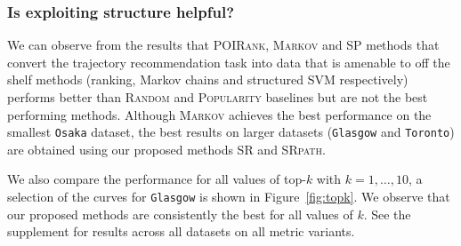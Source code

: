 \subsubsection{Is exploiting structure helpful?}
We can observe from the results that \textsc{POIRank}, \textsc{Markov} and \textsc{SP}
methods that convert the trajectory recommendation task
into data that is amenable to off the shelf methods (ranking, Markov chains and structured SVM respectively)
performs better than \textsc{Random} and \textsc{Popularity} baselines but are not the best performing methods.
Although \textsc{Markov} achieves the best performance on the smallest \texttt{Osaka} dataset,
the best results on larger datasets (\ie \texttt{Glasgow} and \texttt{Toronto}) are obtained using our proposed methods
\textsc{SR} and \textsc{SRpath}.


We also compare the performance for all values of top-$k$ with $k=1,\ldots,10$,
a selection of the curves for \texttt{Glasgow} is shown in Figure~\ref{fig:topk}. We observe that
our proposed methods are consistently the best for all values of $k$.
See the supplement for results across all datasets on all metric variants.


